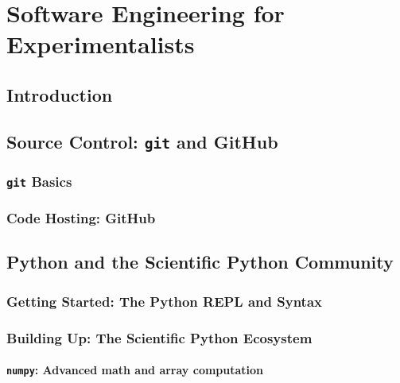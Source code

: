 \chapter{Software Engineering for Experimentalists} \label{cha:swe}

\clearpage

\section{Introduction}  %

\clearpage

\section{Source Control: \texttt{git} and GitHub}  %

\subsection{\texttt{git} Basics}  %

\subsection{Code Hosting: GitHub}  %

\section{Python and the Scientific Python Community}  %

\subsection{Getting Started: The Python REPL and Syntax}  %

\subsection{Building Up: The Scientific Python Ecosystem}

\subsubsection{\texttt{numpy}: Advanced math and array computation}
